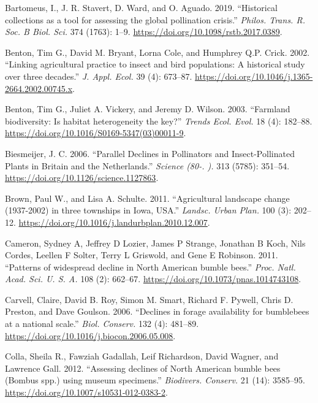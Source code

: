 \documentclass[11pt,]{article}
\begin{document}
\leavevmode\hypertarget{ref-Bartomeus2019}{}%
Bartomeus, I., J. R. Stavert, D. Ward, and O. Aguado. 2019. ``Historical
collections as a tool for assessing the global pollination crisis.''
\emph{Philos. Trans. R. Soc. B Biol. Sci.} 374 (1763): 1--9.
\url{https://doi.org/10.1098/rstb.2017.0389}.

\leavevmode\hypertarget{ref-Benton2002}{}%
Benton, Tim G., David M. Bryant, Lorna Cole, and Humphrey Q.P. Crick.
2002. ``Linking agricultural practice to insect and bird populations: A
historical study over three decades.'' \emph{J. Appl. Ecol.} 39 (4):
673--87. \url{https://doi.org/10.1046/j.1365-2664.2002.00745.x}.

\leavevmode\hypertarget{ref-Benton2003}{}%
Benton, Tim G., Juliet A. Vickery, and Jeremy D. Wilson. 2003.
``Farmland biodiversity: Is habitat heterogeneity the key?''
\emph{Trends Ecol. Evol.} 18 (4): 182--88.
\url{https://doi.org/10.1016/S0169-5347(03)00011-9}.

\leavevmode\hypertarget{ref-Biesmeijer2006}{}%
Biesmeijer, J. C. 2006. ``Parallel Declines in Pollinators and
Insect-Pollinated Plants in Britain and the Netherlands.'' \emph{Science
(80-. ).} 313 (5785): 351--54.
\url{https://doi.org/10.1126/science.1127863}.

\leavevmode\hypertarget{ref-Brown2011}{}%
Brown, Paul W., and Lisa A. Schulte. 2011. ``Agricultural landscape
change (1937-2002) in three townships in Iowa, USA.'' \emph{Landsc.
Urban Plan.} 100 (3): 202--12.
\url{https://doi.org/10.1016/j.landurbplan.2010.12.007}.

\leavevmode\hypertarget{ref-Cameron2011}{}%
Cameron, Sydney A, Jeffrey D Lozier, James P Strange, Jonathan B Koch,
Nils Cordes, Leellen F Solter, Terry L Griswold, and Gene E Robinson.
2011. ``Patterns of widespread decline in North American bumble bees.''
\emph{Proc. Natl. Acad. Sci. U. S. A.} 108 (2): 662--67.
\url{https://doi.org/10.1073/pnas.1014743108}.

\leavevmode\hypertarget{ref-Carvell2006b}{}%
Carvell, Claire, David B. Roy, Simon M. Smart, Richard F. Pywell, Chris
D. Preston, and Dave Goulson. 2006. ``Declines in forage availability
for bumblebees at a national scale.'' \emph{Biol. Conserv.} 132 (4):
481--89. \url{https://doi.org/10.1016/j.biocon.2006.05.008}.

\leavevmode\hypertarget{ref-Colla2012}{}%
Colla, Sheila R., Fawziah Gadallah, Leif Richardson, David Wagner, and
Lawrence Gall. 2012. ``Assessing declines of North American bumble bees
(Bombus spp.) using museum specimens.'' \emph{Biodivers. Conserv.} 21
(14): 3585--95. \url{https://doi.org/10.1007/s10531-012-0383-2}.
\end{document}
